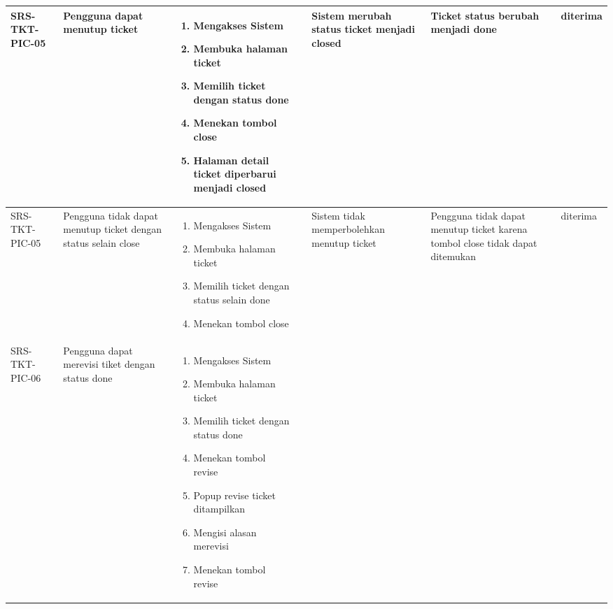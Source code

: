 \documentclass[12pt]{article}
\begin{document}
\begin{enumerate}[label=\textbf{5.\arabic*.}]
\begin{enumerate}[label=\textbf{5.2.\arabic*.}]
\begin{landscape}
\begin{longtable}{ |l|p{}|p{}|p{}|p{}|p{}|l| }
                \hline
                SRS-TKT-PIC-05 & Pengguna dapat menutup ticket & 
                \begin{enumerate}[label=\arabic*.] 
                    \item Mengakses Sistem
                    \item Membuka halaman ticket
                    \item Memilih ticket dengan status done
                    \item Menekan tombol close
                    \item Halaman detail ticket diperbarui menjadi closed
                \end{enumerate} 
                &  & Sistem merubah status ticket menjadi closed
                & Ticket status berubah menjadi done & diterima \\
                \hline
                SRS-TKT-PIC-05 & Pengguna tidak dapat menutup ticket dengan status selain close & 
                \begin{enumerate}[label=\arabic*.] 
                    \item Mengakses Sistem
                    \item Membuka halaman ticket
                    \item Memilih ticket dengan status selain done
                    \item Menekan tombol close
                \end{enumerate} 
                &  & Sistem tidak memperbolehkan menutup ticket
                & Pengguna tidak dapat menutup ticket karena tombol close tidak dapat ditemukan & diterima \\
                \hline
                SRS-TKT-PIC-06 & Pengguna dapat merevisi tiket dengan status done & 
                \begin{enumerate}[label=\arabic*.] 
                    \item Mengakses Sistem
                    \item Membuka halaman ticket
                    \item Memilih ticket dengan status done
                    \item Menekan tombol revise
                    \item Popup revise ticket ditampilkan
                    \item Mengisi alasan merevisi
                    \item Menekan tombol revise

\end{enumerate}
\end{longtable}
\end{landscape}
\end{enumerate}
\end{enumerate}
\end{document}
